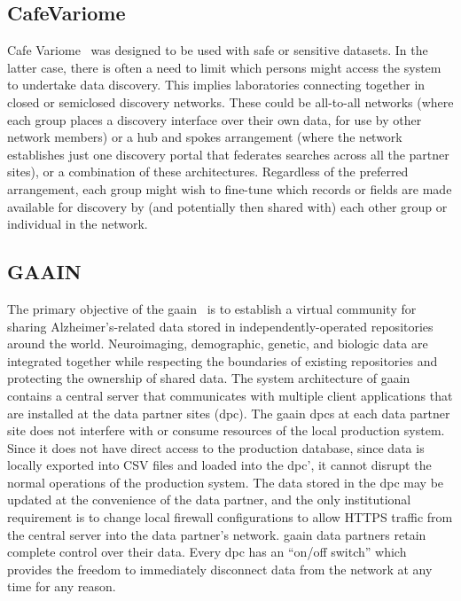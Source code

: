 \subsection*{CafeVariome}
Cafe Variome~\cite{cafevariome} was designed to be used with safe or sensitive datasets.
In the latter case, there is often a need to limit which persons might access the system to undertake data discovery.
This implies laboratories connecting together in closed or semiclosed discovery networks.
These could be all-to-all networks (where each group places a discovery interface over their own data, for use by other network members) or a hub and spokes arrangement (where the network establishes just one discovery portal that federates searches across all the partner sites), or a combination of these architectures.
Regardless of the preferred arrangement, each group might wish to fine-tune which records or fields are made available for discovery by (and potentially then shared with) each other group or individual in the network.

\subsection*{GAAIN}
The primary objective of the \gls{gaain}~\cite{gaain} is to establish a virtual community for sharing Alzheimer's-related data stored in independently-operated repositories around the world.
Neuroimaging, demographic, genetic, and biologic data are integrated together while respecting the boundaries of existing repositories and protecting the ownership of shared data.
The system architecture of \gls{gaain} contains a central server that communicates with multiple client applications that are installed at the data partner sites (\gls{dpc}).
The \gls{gaain} \gls{dpc}s at each data partner site does not interfere with or consume resources of the local production system.
Since it does not have direct access to the production database, since data is locally exported into CSV files and loaded into the \gls{dpc}', it cannot disrupt the normal operations of the production system.
The data stored in the \gls{dpc} may be updated at the convenience of the data partner, and the only institutional requirement is to change local firewall configurations to allow HTTPS traffic from the central server into the data partner's network.
\gls{gaain} data partners retain complete control over their data.
Every \gls{dpc} has an “on/off switch” which provides the freedom to immediately disconnect data from the network at any time for any reason.

